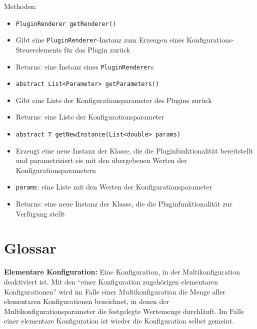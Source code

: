 \documentclass[parskip=full,11pt]{scrartcl}
\begin{document}
Methoden:
\begin{itemize}\itemsep -10pt
\item \texttt{PluginRenderer getRenderer()}
\item[] Gibt eine \texttt{PluginRenderer}-Instanz zum Erzeugen eines Konfigurations-Steuerelements für das Plugin zurück
\item[] Returns: eine Instanz eines \texttt{PluginRenderer}s
\item \texttt{abstract List<Parameter> getParameters()}
\item[] Gibt eine Liste der Konfigurationsparameter des Plugins zurück
\item[] Returns: eine Liste der Konfigurationsparameter
\item \texttt{abstract T getNewInstance(List<double> params)}
\item[] Erzeugt eine neue Instanz der Klasse, die die Pluginfunktionalität bereitstellt und parametrisiert sie mit den übergebenen Werten der Konfigurationsparametern
\item[] \texttt{params}: eine Liste mit den Werten der Konfigurationsparameter
\item[] Returns: eine neue Instanz der Klasse, die die Pluginfunktionalität zur Verfügung stellt
\end{itemize}

\section{Glossar}
\textbf{Elementare Konfiguration:}
Eine Konfiguration, in der Multikonfiguration deaktiviert ist. Mit den \enquote{einer Konfiguration zugehörigen elementaren Konfigurationen} wird im Falle einer Multikonfiguration die Menge aller elementaren Konfigurationen bezeichnet, in denen der Multikonfigurationsparameter die festgelegte Wertemenge durchläuft. Im Falle einer elementare Konfiguration ist wieder die Konfiguration selbst gemeint.
\end{document}
